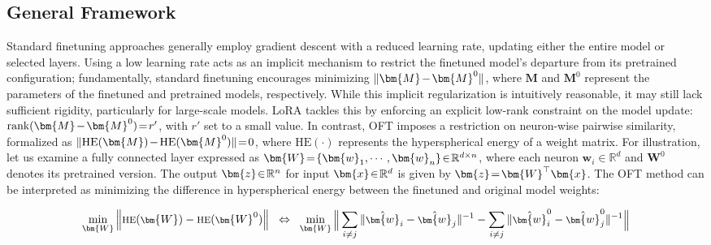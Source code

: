 \subsection{General Framework}

Standard finetuning approaches generally employ gradient descent with a reduced learning rate, updating either the entire model or selected layers. Using a low learning rate acts as an implicit mechanism to restrict the finetuned model's departure from its pretrained configuration; fundamentally, standard finetuning encourages minimizing $\thickmuskip=2mu \medmuskip=2mu \| \bm{M} - \bm{M}^0\|$, where $\bm{M}$ and $\bm{M}^0$ represent the parameters of the finetuned and pretrained models, respectively. While this implicit regularization is intuitively reasonable, it may still lack sufficient rigidity, particularly for large-scale models. LoRA tackles this by enforcing an explicit low-rank constraint on the model update: $\thickmuskip=2mu \medmuskip=2mu \text{rank}(\bm{M} - \bm{M}^0)=r'$, with $r'$ set to a small value. In contrast, OFT imposes a restriction on neuron-wise pairwise similarity, formalized as $\thickmuskip=2mu \medmuskip=2mu \| \text{HE}(\bm{M})-\text{HE}(\bm{M}^0) \|=0$, where $\text{HE}(\cdot)$ represents the hyperspherical energy of a weight matrix. For illustration, let us examine a fully connected layer expressed as $\thickmuskip=2mu \medmuskip=2mu \bm{W}=\{\bm{w}_1,\cdots,\bm{w}_n\}\in\mathbb{R}^{d\times n}$, where each neuron $\bm{w}_i\in\mathbb{R}^d$ and $\bm{W}^0$ denotes its pretrained version. The output $\thickmuskip=2mu \medmuskip=2mu \bm{z}\in\mathbb{R}^n$ for input $\thickmuskip=2mu \medmuskip=2mu \bm{x}\in\mathbb{R}^d$ is given by $\thickmuskip=2mu \medmuskip=2mu \bm{z}=\bm{W}^\top\bm{x}$. The OFT method can be interpreted as minimizing the difference in hyperspherical energy between the finetuned and original model weights:

\begin{equation}\label{eq:oft_principle}
\footnotesize
\min_{\bm{W}} \left\| \text{HE}(\bm{W})-\text{HE}(\bm{W}^0)\right\|~~\Leftrightarrow~~\min_{\bm{W}} \bigg{\|} \sum_{i\neq j} \|\hat{\bm{w}}_i-\hat{\bm{w}}_j\|^{-1}-\sum_{i\neq j} \|\hat{\bm{w}}^0_i-\hat{\bm{w}}^0_j\|^{-1}\bigg{\|}
\end{equation}

